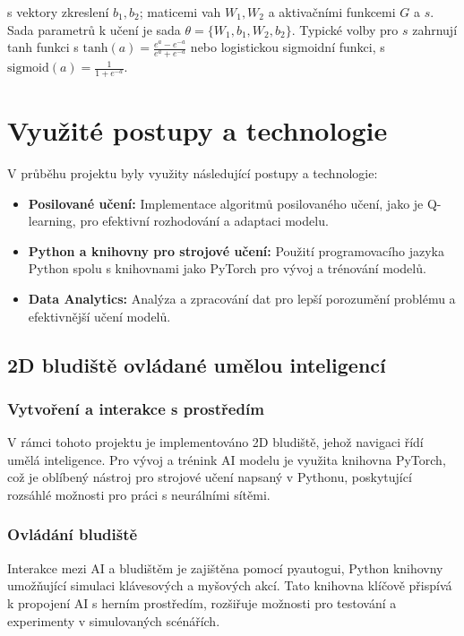 \documentclass[12pt, a4paper,
twoside,        %
openright
]{report}
\begin{document}
s vektory zkreslení \( b_1, b_2 \); maticemi vah \( W_1, W_2 \) a aktivačními funkcemi \( G \) a \( s \). Sada parametrů k učení je sada \( \theta = \{W_1, b_1, W_2, b_2\} \). Typické volby pro \( s \) zahrnují tanh funkci s \( \text{tanh}(a) = \frac{e^a - e^{-a}}{e^a + e^{-a}} \) nebo logistickou sigmoidní funkci, s \( \text{sigmoid}(a) = \frac{1}{1 + e^{-a}} \).

\chapter{Využité postupy a technologie}
V průběhu projektu byly využity následující postupy a technologie:

\begin{itemize}
	\item \textbf{Posilované učení:} Implementace algoritmů posilovaného učení, jako je Q-learning, pro efektivní rozhodování a adaptaci modelu.
	\item \textbf{Python a knihovny pro strojové učení:} Použití programovacího jazyka Python spolu s knihovnami jako PyTorch pro vývoj a trénování modelů.
	\item \textbf{Data Analytics:} Analýza a zpracování dat pro lepší porozumění problému a efektivnější učení modelů.
\end{itemize}

\section{2D bludiště ovládané umělou inteligencí}

\subsection{Vytvoření a interakce s prostředím}
V rámci tohoto projektu je implementováno 2D bludiště, jehož navigaci řídí umělá inteligence. Pro vývoj a trénink AI modelu je využita knihovna PyTorch, což je oblíbený nástroj pro strojové učení napsaný v Pythonu, poskytující rozsáhlé možnosti pro práci s neurálními sítěmi. 

\subsection{Ovládání bludiště}
Interakce mezi AI a bludištěm je zajištěna pomocí pyautogui, Python knihovny umožňující simulaci klávesových a myšových akcí. Tato knihovna klíčově přispívá k propojení AI s herním prostředím, rozšiřuje možnosti pro testování a experimenty v simulovaných scénářích.
\end{document}
